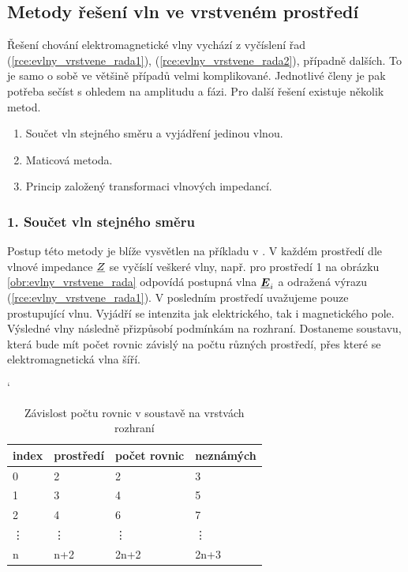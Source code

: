 \subsection{Metody řešení vln ve vrstveném prostředí}
Řešení chování elektromagnetické vlny vychází z vyčíslení řad (\ref{rce:evlny_vrstvene_rada1}), (\ref{rce:evlny_vrstvene_rada2}), případně dalších. To je samo o sobě ve většině případů velmi komplikované. Jednotlivé členy je pak potřeba sečíst s ohledem na amplitudu a fázi. Pro další řešení existuje několik metod.
\begin{enumerate}
\item Součet vln stejného směru a vyjádření jedinou vlnou.
\item Maticová metoda.
\item Princip založený transformaci vlnových impedancí.
\end{enumerate}

\subsubsection*{1. Součet vln stejného směru}
Postup této metody je blíže vysvětlen na příkladu v \cite[str. 103 - 104]{emp}. V každém prostředí dle vlnové impedance ${\underline{Z}}$ se vyčíslí veškeré vlny, např. pro prostředí 1 na obrázku \ref{obr:evlny_vrstvene_rada} odpovídá postupná vlna $\mbox{\underline{\boldmath$E$}}_{i}$ a odražená výrazu (\ref{rce:evlny_vrstvene_rada1}). V posledním prostředí uvažujeme pouze prostupující vlnu. Vyjádří se intenzita jak elektrického, tak i magnetického pole. Výsledné vlny následně přizpůsobí podmínkám na rozhraní. Dostaneme soustavu, která bude mít počet rovnic závislý na počtu různých prostředí, přes které se elektromagnetická vlna šíří.

\begin{table}[!h]
\catcode` 
\begin{center}
  	\caption{Závislost počtu rovnic v soustavě na vrstvách rozhraní}
  	\label{tab:evlny_vrstvene_prostredi}
\begin{tabular}{|l|l|l|l|}
	\hline
	index & prostředí & počet rovnic & neznámých \\
	\hline
	0 & 2 & 2 & 3 \\
	1 & 3 & 4 & 5 \\
	2 & 4 & 6 & 7 \\
	\vdots & \vdots & \vdots & \vdots \\
	n & n+2 & 2n+2 & 2n+3 \\
	\hline
\end{tabular}
\end{center}
\end{table}

